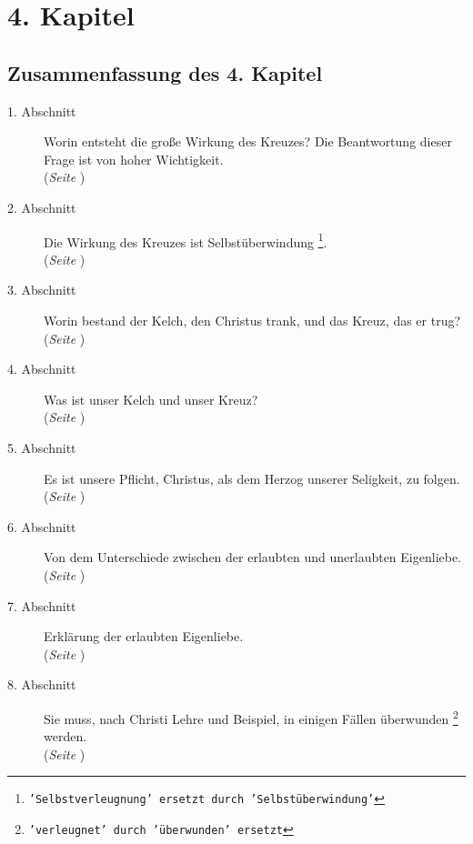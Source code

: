 

\chapter{4. Kapitel} \label{kap4}

\section{Zusammenfassung des 4. Kapitel}
\footnotesize
\begin{description}
\item[1. Abschnitt] Worin entsteht die große Wirkung des Kreuzes? Die
Beantwortung dieser Frage ist von hoher Wichtigkeit.
\\(\textit{Seite \pageref{kap4_ab1}})
\item[2. Abschnitt] Die Wirkung des Kreuzes ist Selbstüberwindung
\footnote{\texttt{'Selbstverleugnung' ersetzt durch 'Selbstüberwindung'}}.
\\(\textit{Seite \pageref{kap4_ab2}})
\item[3. Abschnitt] Worin bestand der Kelch, den Christus trank, und das Kreuz,
das er trug?
\\(\textit{Seite \pageref{kap4_ab3}})
\item[4. Abschnitt]  Was ist unser Kelch und unser Kreuz?
\\(\textit{Seite \pageref{kap4_ab4}})
\item[5. Abschnitt] Es ist unsere Pflicht, Christus, als dem Herzog unserer
Seligkeit, zu folgen.
\\(\textit{Seite \pageref{kap4_ab5}})
\item[6. Abschnitt] Von dem Unterschiede zwischen der erlaubten und unerlaubten
Eigenliebe.
\\(\textit{Seite \pageref{kap4_ab6}})
\item[7. Abschnitt] Erklärung der erlaubten Eigenliebe.
\\(\textit{Seite \pageref{kap4_ab7}})
\item[8. Abschnitt] Sie muss, nach Christi Lehre und Beispiel, in einigen Fällen
überwunden \footnote{\texttt{'verleugnet' durch 'überwunden' ersetzt}} werden.
\\(\textit{Seite \pageref{kap4_ab8}})

\end{description}
